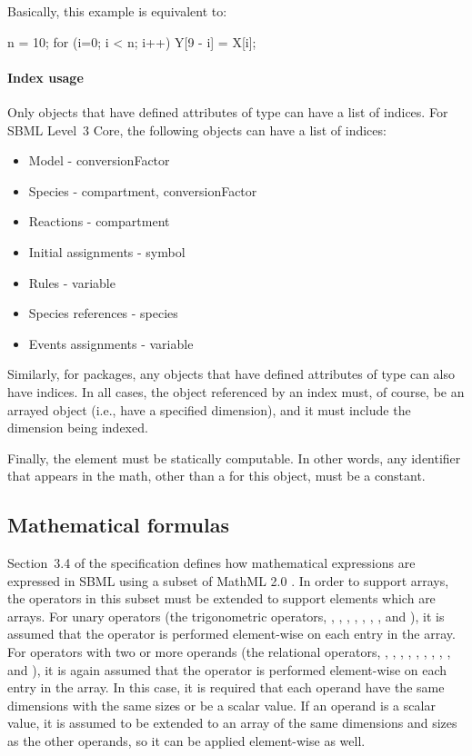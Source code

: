 Basically, this example is equivalent to:

\begin{example}
n = 10;
for (i=0; i < n; i++) {
    Y[9 - i] = X[i];
}
\end{example}

\paragraph{Index usage}

Only objects that have defined attributes of  type can have a list of indices.  For SBML Level~3 Core, the following objects can have a list of indices:
\begin{itemize}
\item Model - conversionFactor
\item Species - compartment, conversionFactor
\item Reactions - compartment
\item Initial assignments - symbol
\item Rules - variable
\item Species references - species
\item Events assignments - variable
\end{itemize}
Similarly, for packages, any objects that have defined attributes of  type can also have indices.  In all cases, the object referenced by an index must, of course, be an arrayed object (i.e., have a specified dimension), and it must include the dimension being indexed.

Finally, the  element must be statically computable.  In other words, any identifier that appears in the math, other than a \Dimension {} for this object, must be a constant.

\subsection{Mathematical formulas}
\label{math-formulas}
Section~3.4 of the \sbmlthreecore specification defines how mathematical expressions are expressed in SBML using a subset of MathML 2.0 \citep{w3c:2000b}.  In order to support arrays, the operators in this subset must be extended to support  elements which are arrays.  For unary operators (the trigonometric operators, , , , , , , , and ), it is assumed that the operator is performed element-wise on each entry in the array.  For operators with two or more operands (the relational operators, , , , , , , , , , and ), it is again assumed that the operator is performed element-wise on each entry in the array.  In this case, it is required that each operand have the same dimensions with the same sizes or be a scalar value.  If an operand is a scalar value, it is assumed to be extended to an array of the same dimensions and sizes as the other operands, so it can be applied element-wise as well.  

